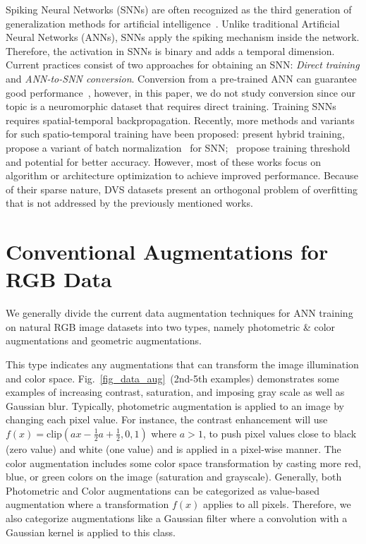\documentclass[runningheads]{llncs}
\newcommand{\bftab}{\fontseries{b}\selectfont}
\begin{document}
Spiking Neural Networks (SNNs) are often recognized as the third generation of generalization methods for artificial intelligence~\cite{basegmez2014next}. Unlike traditional Artificial Neural Networks (ANNs), SNNs apply the spiking mechanism inside the network. 
Therefore, the activation in SNNs is binary and adds a temporal dimension. Current practices consist of two approaches for obtaining an SNN: \textit{Direct training} and \textit{ANN-to-SNN conversion}. Conversion from a pre-trained ANN can guarantee good performance~\cite{deng2021optimal,diehl2016conversion,rueckauer2016theory,li2021free,li2022converting,han2020deep}, however, in this paper, we do not study conversion since our topic is a neuromorphic dataset that requires direct training. Training SNNs \cite{wu2019direct,wu2018spatio,hazan2018bindsnet,li2021differentiable,deng2022temporal,guo2022recdis} requires spatial-temporal backpropagation. Recently, more methods and variants for such spatio-temporal training have been proposed: \cite{rathi2020enabling} present hybrid training, \cite{zheng2020going,kim2020revisiting} propose a variant of batch normalization~\cite{ioffe2015batch} for SNN;~\cite{rathi2020diet,fang2021incorporating} propose training threshold and potential for better accuracy. However, most of these works focus on algorithm or architecture optimization to achieve improved performance. Because of their sparse nature, DVS datasets present an orthogonal problem of overfitting that is not addressed by the previously mentioned works.

\section{Conventional Augmentations for RGB Data}
\label{sec_da}

We generally divide the current data augmentation techniques for ANN training on natural RGB image datasets into two types, namely photometric \& color augmentations and geometric augmentations. 

\noindent{\bftab Photometric and Color Augmentations. }
This type indicates any augmentations that can transform the image illumination and color space.  Fig.~\ref{fig_data_aug}~(2nd-5th examples) demonstrates some examples of increasing contrast, saturation, and imposing gray scale as well as Gaussian blur. Typically, photometric augmentation is applied to an image by changing each pixel value. For instance, the contrast enhancement will use $f(x) = \mathrm{clip}(ax-\frac{1}{2}a+\frac{1}{2}, 0, 1)$ where $a>1$, to push pixel values close to black (zero value) and white (one value) and is applied in a pixel-wise manner. The color augmentation includes some color space transformation by casting more red, blue, or green colors on the image (\eg saturation and grayscale). 
Generally, both Photometric and Color augmentations can be categorized as value-based augmentation where a transformation $f(x)$ applies to all pixels. Therefore, we also categorize augmentations like a Gaussian filter where a convolution with a Gaussian kernel is applied to this class.  
\end{document}
